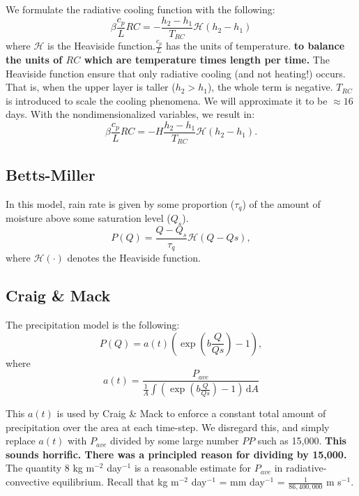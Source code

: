 \documentclass[10pt]{article}
\newcommand{\rmd}{\,\mathrm{d}}
\newcommand{\HH}{\mathcal{H}}
\begin{document}
We formulate the radiative cooling function with the following:
\begin{equation}
\beta \frac{c_p}{L} RC = -\frac{h_2-h_1}{T_{RC}}\HH(h_2-h_1)
\end{equation}
where $\HH$ is the Heaviside function.{\color{blue}$\frac{c_p}{L}$ has the units of temperature.} {\bf to balance the units of $RC$ which are temperature times length per time.} The Heaviside function ensure that only radiative cooling (and not heating!) occurs. 
That is, when the upper layer  is taller ($h_2 > h_1$), the whole term is negative. 
$T_{RC}$ is introduced to scale the cooling phenomena. 
We will approximate it to be $\approx 16$ days. 
{\color{blue} With the nondimensionalized variables, we result in:
	\begin{equation}
	\beta \frac{c_p}{L} RC = -H\frac{h_2-h_1}{T_{RC}}\HH(h_2-h_1).
	\end{equation}
}

\subsection{Betts-Miller}
In this model, rain rate is given by some proportion ($\tau_q$) of the amount of moisture above some saturation level ($Q_s$).
\begin{equation*}
P(Q) = \frac{Q-Q_s}{\tau_q}\HH{(Q-Qs)},
\end{equation*}
where $\HH(\cdot)$ denotes the Heaviside function. 

\subsection{Craig \& Mack \citep{CM2013}}
The precipitation model is the following:
\begin{equation}
P(Q) = a(t)\left(\exp(b\frac{Q}{Qs})-1\right),
\end{equation}
where 
\begin{equation}
a(t) = \frac{P_{ave}}{\frac{1}{A}\int \left( \exp(b\frac{Q}{Qs})-1 \right)\rmd A}
\end{equation}

This $a(t)$ is used by Craig \& Mack to enforce a constant total amount of precipitation over the area at each time-step. 
{\color{blue} We disregard this, and simply replace $a(t)$ with $P_{ave}$ divided by some large number $PP$ such as 15,000.}
{\bf This sounds horrific. There was a principled reason for dividing by 15,000.} 
The quantity $8$ kg m$^{-2}$ day$^{-1}$ is a reasonable estimate for $P_{ave}$ in radiative-convective equilibrium.
Recall that kg m$^{-2}$ day$^{-1}$ = mm day$^{-1}$ = $\frac{1}{86,400,000}$ m s$^{-1}$. 
\end{document}
